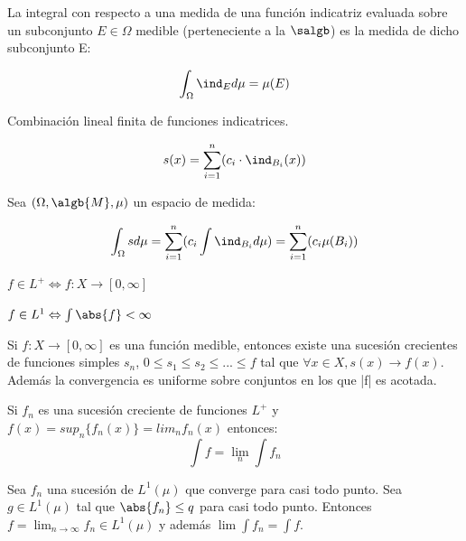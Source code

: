 \documentclass{apuntes}
\begin{document}
\begin{defn}
La integral con respecto a una medida de una función indicatriz evaluada sobre un subconjunto $E \in \Omega$ medible (perteneciente a la $\salgb$) es la medida de dicho subconjunto E:

\[\int_{\Omega} \ind_{E}d\mu = \mu(E)\]
\end{defn}

\begin{defn}
Combinación lineal finita de funciones indicatrices.

\[
s(x) = \sum_{i=1}^{n}(c_i \cdot \ind_{B_i}(x))
\]
\end{defn}

\begin{defn}
Sea $(\Omega,\algb{M},\mu)$ un espacio de medida:

\[\int_{\Omega} sd\mu = \sum_{i=1}^{n}(c_i \int \ind_{B_i} d\mu) = \sum_{i=1}^{n}(c_i \mu(B_i))\]
\end{defn}

\begin{defn}[Función $L^+$]
$f \in L^+ \Leftrightarrow f:X\rightarrow [0, \infty]$
\end{defn}

\begin{defn}[Función $L^1$]
$f \in L^1 \Leftrightarrow \int \abs{f} < \infty $
\end{defn}

\begin{defn}
Si $f:X \rightarrow [0, \infty]$ es una función medible, entonces existe una sucesión crecientes de funciones simples $s_n$, $0 \leq s_1 \leq s_2 \leq ... \leq f$ tal que $\forall x  \in X, s(x) \rightarrow f(x)$. Además la convergencia es uniforme sobre conjuntos en los que |f| es acotada.
\end{defn}

\begin{defn}
Si $f_n$ es una sucesión creciente de funciones $L^+$ y $f(x)=sup_n\{f_n(x)\}=lim_nf_n(x)$ entonces:
\[
\int f = \lim_n \int f_n
\]
\end{defn}

\begin{defn}
Sea $f_n$ una sucesión de $L^1(\mu)$ que converge para casi todo punto. Sea $g \in L^1(\mu)$ tal que $\abs{f_n} \leq q$ para casi todo punto. Entonces $f=\lim_{n \rightarrow \infty} f_n \in L^1(\mu)$ y además $\lim \int f_n = \int f$.
\end{defn}
\end{document}
